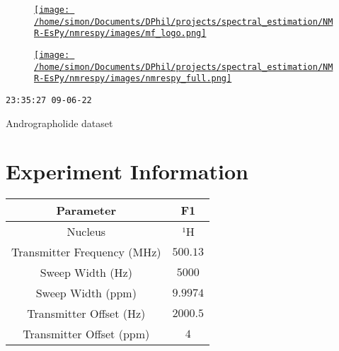 \documentclass[8pt]{article}
\begin{document}
\begin{figure}[!ht]
\begin{minipage}[b][2.5cm][c]{.72\textwidth}
\href{http://foroozandeh.chem.ox.ac.uk/home}%
{\texttt{[image: /home/simon/Documents/DPhil/projects/spectral\_estimation/NMR-EsPy/nmrespy/images/mf\_logo.png]}}
\end{minipage}
\begin{minipage}[b][2.5cm][c]{.27\textwidth}
\href{https://foroozandehgroup.github.io/NMR-EsPy}%
{\texttt{[image: /home/simon/Documents/DPhil/projects/spectral\_estimation/NMR-EsPy/nmrespy/images/nmrespy\_full.png]}}
\end{minipage}
\end{figure}
\texttt{23:35:27 09-06-22}

Andrographolide dataset

\section*{Experiment Information}
\begin{longtable}[l]{c c}
\toprule
Parameter & F1\\
\midrule
Nucleus & ¹H\\
Transmitter Frequency (MHz) & $\num{500.13}$\\
Sweep Width (Hz) & $\num{5000}$\\
Sweep Width (ppm) & $\num{9.9974}$\\
Transmitter Offset (Hz) & $\num{2000.5}$\\
Transmitter Offset (ppm) & $\num{4}$\\
\bottomrule
\end{longtable}
\end{document}
